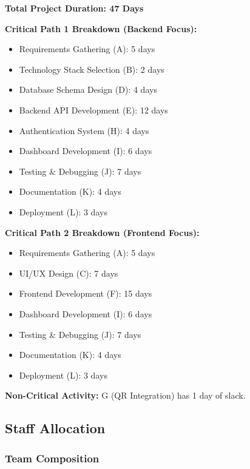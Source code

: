 \documentclass[12pt,a4paper]{article}
\begin{document}
\vspace{0.3cm}
\textbf{Total Project Duration: 47 Days}

\textbf{Critical Path 1 Breakdown (Backend Focus):}
\begin{itemize}[noitemsep]
    \item Requirements Gathering (A): 5 days
    \item Technology Stack Selection (B): 2 days
    \item Database Schema Design (D): 4 days
    \item Backend API Development (E): 12 days
    \item Authentication System (H): 4 days
    \item Dashboard Development (I): 6 days
    \item Testing \& Debugging (J): 7 days
    \item Documentation (K): 4 days
    \item Deployment (L): 3 days
\end{itemize}

\textbf{Critical Path 2 Breakdown (Frontend Focus):}
\begin{itemize}[noitemsep]
    \item Requirements Gathering (A): 5 days
    \item UI/UX Design (C): 7 days
    \item Frontend Development (F): 15 days
    \item Dashboard Development (I): 6 days
    \item Testing \& Debugging (J): 7 days
    \item Documentation (K): 4 days
    \item Deployment (L): 3 days
\end{itemize}

\textbf{Non-Critical Activity:} G (QR Integration) has 1 day of slack.


\subsection{Staff Allocation}

\subsubsection{Team Composition}
\end{document}
